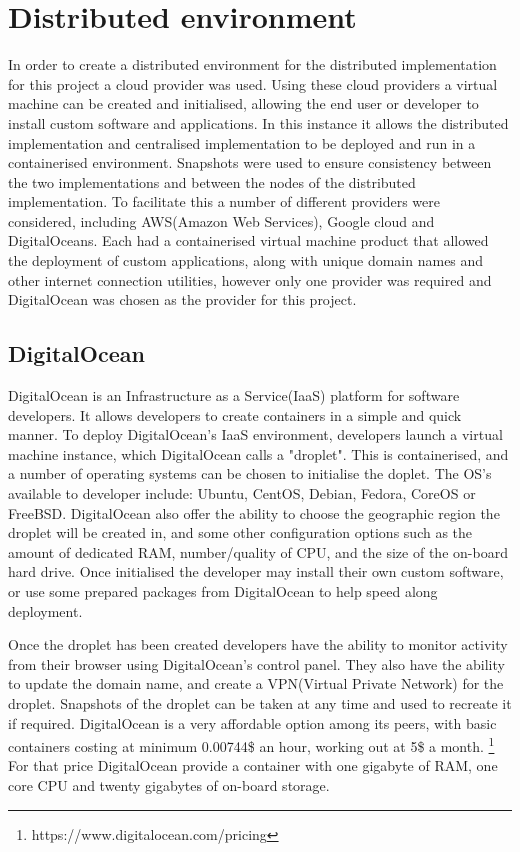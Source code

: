 \documentclass[oneside,12pt]{book}
\begin{document}
\section{Distributed environment}
In order to create a distributed environment for the distributed implementation for this project a cloud provider was used. Using these cloud providers a virtual machine can be created and initialised, allowing the end user or developer to install custom software and applications. In this instance it allows the distributed implementation and centralised implementation to be deployed and run in a containerised environment. Snapshots were used to ensure consistency between the two implementations and between the nodes of the distributed implementation. To facilitate this a number of different providers were considered, including AWS(Amazon Web Services), Google cloud and DigitalOceans. Each had a containerised virtual machine product that allowed the deployment of custom applications, along with unique domain names and other internet connection utilities, however only one provider was required and DigitalOcean was chosen as the provider for this project. 

\subsection{DigitalOcean}
DigitalOcean is an Infrastructure as a Service(IaaS) platform for software developers. It allows developers to create containers in a simple and quick manner. To deploy DigitalOcean's IaaS environment, developers launch a virtual machine instance, which DigitalOcean calls a "droplet". This is containerised, and a number of operating systems can be chosen to initialise the doplet. The OS's available to developer include: Ubuntu, CentOS, Debian, Fedora, CoreOS or FreeBSD. DigitalOcean also offer the ability to choose the geographic region the droplet will be created in, and some other configuration options such as the amount of dedicated RAM, number/quality of CPU, and the size of the on-board hard drive. Once initialised the developer may install their own custom software, or use some prepared packages from DigitalOcean to help speed along deployment. 

Once the droplet has been created developers have the ability to monitor activity from their browser using DigitalOcean's control panel. They also have the ability to update the domain name, and create a VPN(Virtual Private Network) for the droplet. Snapshots of the droplet can be taken at any time and used to recreate it if required. DigitalOcean is a very affordable option among its peers, with basic containers costing at minimum 0.00744\$ an hour, working out at 5\$ a month. \footnote{https://www.digitalocean.com/pricing} For that price DigitalOcean provide a container with one gigabyte of RAM, one core CPU and twenty gigabytes of on-board storage.
\end{document}
